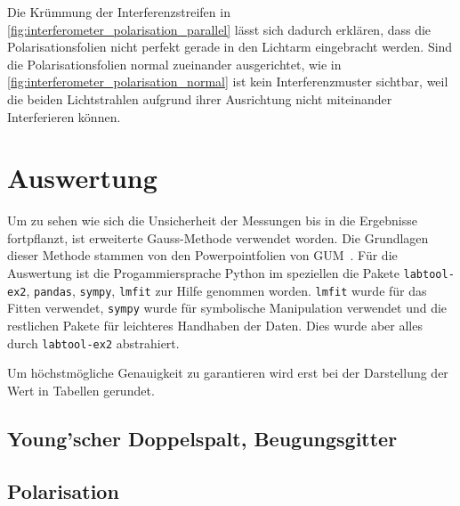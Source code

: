 \documentclass[12pt,english,ngerman]{scrartcl}
\begin{document}
Die Krümmung der Interferenzstreifen in \autoref{fig:interferometer_polarisation_parallel} lässt sich dadurch erklären, dass 
die Polarisationsfolien nicht perfekt gerade in den Lichtarm eingebracht werden. Sind die Polarisationsfolien normal 
zueinander ausgerichtet, wie in \autoref{fig:interferometer_polarisation_normal} ist kein Interferenzmuster sichtbar, 
weil die beiden Lichtstrahlen aufgrund ihrer Ausrichtung nicht miteinander Interferieren können.

\section{Auswertung}\label{sec:auswertung}

Um zu sehen wie sich die Unsicherheit der Messungen bis in die Ergebnisse
fortpflanzt, ist erweiterte Gauss-Methode verwendet worden. Die Grundlagen
dieser Methode stammen von den Powerpointfolien von
GUM~\cite{wolfgang_kessel_isobipm-gum_2004}. Für die Auswertung ist die
Progammiersprache Python im speziellen die Pakete \verb#labtool-ex2#,
\verb#pandas#, \verb#sympy#, \verb#lmfit# zur Hilfe genommen worden.
\verb#lmfit# wurde für das Fitten verwendet, \verb#sympy# wurde für symbolische
Manipulation verwendet und die restlichen Pakete für leichteres Handhaben der
Daten. Dies wurde aber alles durch \verb#labtool-ex2# abstrahiert.

Um höchstmögliche Genauigkeit zu garantieren wird erst bei der Darstellung der
Wert in Tabellen gerundet.

\subsection{Young'scher Doppelspalt, Beugungsgitter}



\subsection{Polarisation}

\end{document}
